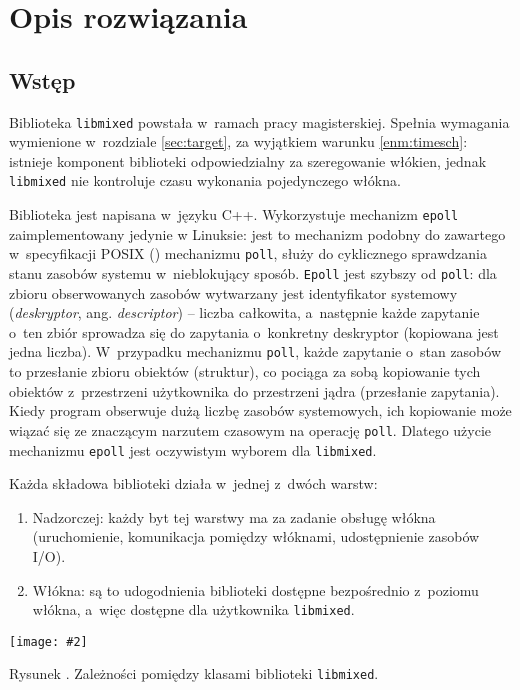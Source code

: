 \documentclass[12pt]{mwart}
\newcommand{\code}{\texttt}
\newcounter{figmain}
\newcommand{\myownfigure}[4]{ \newcounter{#1} \setcounter{#1}{\value{figmain}} \addtocounter{figmain}{1} \begin{center} \label{fig:#1} \centering \texttt{[image: \#2]}\\ \nopagebreak[5] \parbox[t]{11.5cm}{Rysunek \arabic{#1}. #3.} \end{center}}
\begin{document}
\section{Opis rozwiązania}
\label{sec:solution}
\subsection{Wstęp}
\indent 
  Biblioteka \code{libmixed} powstała w~ramach pracy magisterskiej. Spełnia wymagania wymienione w~rozdziale \ref{sec:target}, za wyjątkiem warunku \ref{enm:timesch}:
  istnieje komponent biblioteki odpowiedzialny za szeregowanie włókien, jednak \code{libmixed} nie kontroluje czasu wykonania pojedynczego włókna.
\par
\indent
  Biblioteka jest napisana w~języku C++. Wykorzystuje mechanizm \code{epoll} zaimplementowany jedynie w Linuksie: jest to mechanizm podobny do
  zawartego w~specyfikacji POSIX (\cite{POSIX}) mechanizmu \code{poll}, służy do cyklicznego sprawdzania stanu zasobów systemu w~nieblokujący sposób.
  \code{Epoll} jest szybszy od \code{poll}: dla zbioru obserwowanych zasobów wytwarzany jest identyfikator systemowy 
  (\emph{deskryptor}, ang. \emph{descriptor}) -- liczba całkowita, a~następnie każde zapytanie o~ten zbiór sprowadza się do zapytania
  o~konkretny deskryptor (kopiowana jest jedna liczba). W~przypadku mechanizmu \code{poll}, każde zapytanie o~stan zasobów to przesłanie zbioru obiektów (struktur),
  co pociąga za sobą kopiowanie tych obiektów z~przestrzeni użytkownika do przestrzeni jądra (przesłanie zapytania). Kiedy program obserwuje dużą liczbę
  zasobów systemowych, ich kopiowanie może wiązać się ze znaczącym narzutem czasowym na operację \code{poll}. Dlatego użycie mechanizmu \code{epoll} jest
  oczywistym wyborem dla \code{libmixed}.
\par
\indent
  Każda składowa biblioteki działa w~jednej z~dwóch warstw:
  \begin{enumerate}
    \item Nadzorczej: każdy byt tej warstwy ma za zadanie obsługę włókna (uruchomienie, komunikacja pomiędzy włóknami, udostępnienie
      zasobów I/O).
    \item Włókna: są to udogodnienia biblioteki dostępne bezpośrednio z~poziomu włókna, a~więc dostępne dla użytkownika \code{libmixed}.
  \end{enumerate}
\par
\begin{center}
  \myownfigure{libmixedoverview}{libmixedOverview.png}{Zależności pomiędzy klasami biblioteki \code{libmixed}}{.7}
\end{center}
\end{document}

